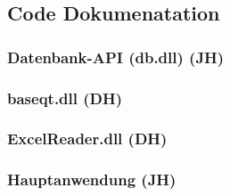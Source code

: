 		\subsection{Code Dokumenatation }		
		\subsubsection{Datenbank-API (db.dll) (JH)}
		

		\subsubsection{baseqt.dll (DH)}
		

		\subsubsection{ExcelReader.dll (DH)}
		

		\subsubsection{Hauptanwendung (JH)}
		
		\newpage